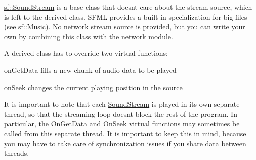 \mbox{\hyperlink{classsf_1_1_sound_stream}{sf\+::\+Sound\+Stream}} is a base class that doesn\textquotesingle{}t care about the stream source, which is left to the derived class. S\+F\+ML provides a built-\/in specialization for big files (see \mbox{\hyperlink{classsf_1_1_music}{sf\+::\+Music}}). No network stream source is provided, but you can write your own by combining this class with the network module.

A derived class has to override two virtual functions\+: \begin{DoxyItemize}
\item on\+Get\+Data fills a new chunk of audio data to be played \item on\+Seek changes the current playing position in the source\end{DoxyItemize}
It is important to note that each \mbox{\hyperlink{classsf_1_1_sound_stream}{Sound\+Stream}} is played in its own separate thread, so that the streaming loop doesn\textquotesingle{}t block the rest of the program. In particular, the On\+Get\+Data and On\+Seek virtual functions may sometimes be called from this separate thread. It is important to keep this in mind, because you may have to take care of synchronization issues if you share data between threads.

